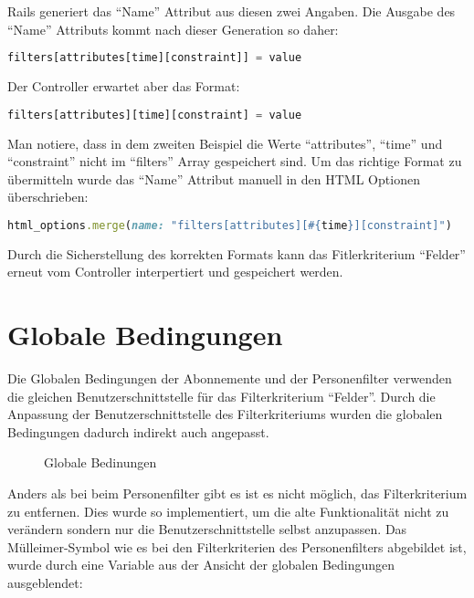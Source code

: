 Rails generiert das ``Name'' Attribut aus diesen zwei Angaben. Die Ausgabe des ``Name'' Attributs kommt nach dieser 
Generation so daher: 
\newline

\begin{lstlisting}[language=Javascript]
    filters[attributes[time][constraint]] = value
\end{lstlisting}

Der Controller erwartet aber das Format:
\newline

\begin{lstlisting}[language=Javascript]
   filters[attributes][time][constraint] = value
\end{lstlisting}

Man notiere, dass in dem zweiten Beispiel die Werte ``attributes'', ``time'' und ``constraint'' nicht
im ``filters'' Array gespeichert sind.
Um das richtige Format zu übermitteln wurde das ``Name'' Attribut manuell in den HTML Optionen überschrieben:
\newline

\begin{lstlisting}[language=Ruby]
   html_options.merge(name: "filters[attributes][#{time}][constraint]")
\end{lstlisting}

Durch die Sicherstellung des korrekten Formats kann das Fitlerkriterium ``Felder'' erneut vom Controller interpertiert und 
gespeichert werden.

\section{Globale Bedingungen}
Die Globalen Bedingungen der Abonnemente und der Personenfilter verwenden die gleichen Benutzerschnittstelle für das Filterkriterium ``Felder''.
Durch die Anpassung der Benutzerschnittstelle des Filterkriteriums wurden die globalen Bedingungen dadurch indirekt auch angepasst.

\begin{figure}[h]
   \centering
   \caption{Globale Bedinungen}
\end{figure}

Anders als bei beim Personenfilter gibt es ist es nicht möglich, das Filterkriterium zu entfernen.
Dies wurde so implementiert, um die alte Funktionalität nicht zu verändern sondern nur die Benutzerschnittstelle selbst anzupassen.
Das Mülleimer-Symbol wie es bei den Filterkriterien des Personenfilters abgebildet ist, wurde durch eine Variable aus der Ansicht der globalen
Bedingungen ausgeblendet:
\newline

